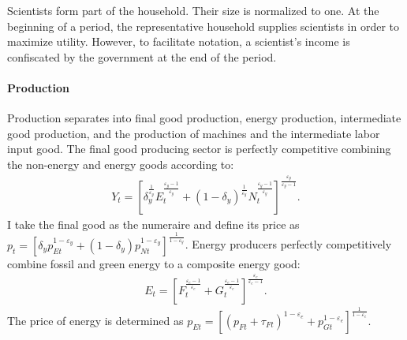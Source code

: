Scientists form part of the household. Their size is normalized to one. At the beginning of a period,  the representative household supplies scientists in order to maximize utility. However, to facilitate notation, a  scientist's income is confiscated by the government at the end of the period. %


\paragraph{Production}
Production separates into final good production, energy production, intermediate good production, and the production of machines and the intermediate labor input good. 
The final good producing sector is perfectly competitive combining the non-energy and energy goods according to:
\begin{align}
Y_t=\left[\delta_y^\frac{1}{\varepsilon_y}E_{t}^{\frac{\varepsilon_y-1}{\varepsilon_y}}+(1-\delta_y)^\frac{1}{\varepsilon_y}N_{t}^{\frac{\varepsilon_y-1}{\varepsilon_y}}\right]^\frac{\varepsilon_y}{\varepsilon_y-1}.
\end{align} 
I take the final good as the numeraire and define its price as $p_t=\left[\delta_yp_{Et}^{1-\varepsilon_y}+(1-\delta_y)p_{Nt}^{1-\varepsilon_y}\right]^{\frac{1}{1-\varepsilon_y}}$.
Energy producers perfectly competitively combine fossil and green energy to a composite energy good:
\begin{align}
E_t=\left[F_t^\frac{\varepsilon_e-1}{\varepsilon_e}+G_t^\frac{\varepsilon_e-1}{\varepsilon_e}\right]^\frac{\varepsilon_e}{\varepsilon_e-1}.
\end{align}
The price of energy is determined as  $p_{Et}= \left[(p_{Ft}+\tau_{Ft})^{1-\varepsilon_e}+p_{Gt}^{1-\varepsilon_e}\right]^\frac{1}{{1-\varepsilon_e}}$.

